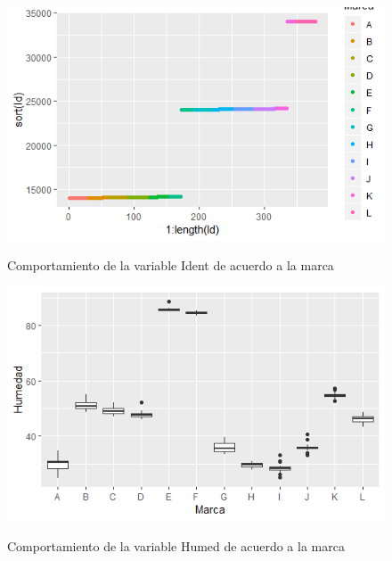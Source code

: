 \documentclass[pdf]{beamer}
\begin{document}
\begin{frame}
\begin{figure}[h]
\centering
\includegraphics[scale=.65]{images/ident.png} 
\label{i2}
\caption{Comportamiento de la variable Ident de acuerdo a la marca}
\end{figure}
\end{frame}


\begin{frame}
\begin{figure}[h]
\centering
\includegraphics[scale=.65]{images/humed.png} 
\label{i3}
\caption{Comportamiento de la variable Humed de acuerdo a la marca}
\end{figure}
\end{frame}
\end{document}
